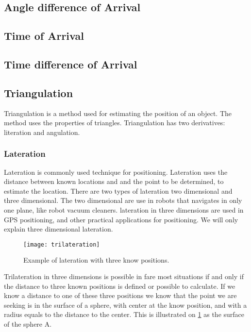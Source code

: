   \subsection{Angle difference of Arrival}

  \subsection{Time of Arrival}

  \subsection{Time difference of Arrival}

  \subsection{Triangulation}

  Triangulation is a method used for estimating the position of an object. The method uses the properties of triangles. Triangulation has two derivatives: literation and angulation.

 \subsubsection{Lateration}

  Lateration is commonly used technique for positioning.  Lateration uses the distance between known locations and and the point to be determined, to estimate the location.\cite{tri_lateration}  There are two types of lateration two dimensional and three dimensional. The two dimensional are use in robots that navigates in only one plane, like robot vacuum cleaners. 
  lateration in three dimensions are used in GPS positioning, and other practical applications for positioning.
  We will only explain three dimensional lateration.
  \begin{figure}[ht!]
  \centering
  \texttt{[image: trilateration]}
  \caption{Example of lateration with three know positions.}
  \label{fig:trilateration}
  \end{figure}
  

  Trilateration in three dimensions is possible in fare most situations if and only if the distance to three known positions is defined or possible to calculate.
  If we know a distance to one of these three positions we know that the point we are seeking is in the surface of a sphere, with center at the know position, and with a radius equals to the distance to the center. This is illustrated on \cref{fig:trilateration} as the surface of the sphere A.


